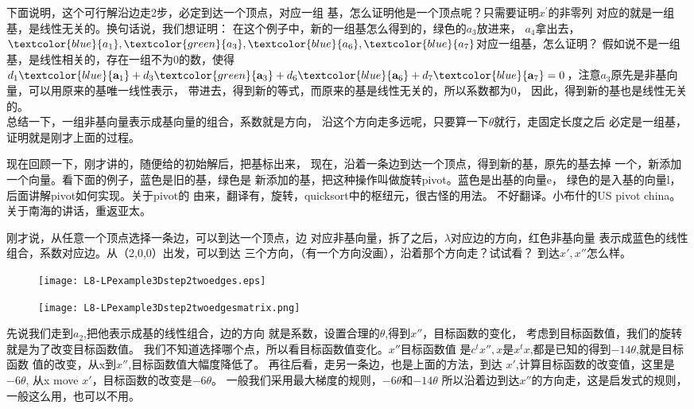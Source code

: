{
	下面说明，这个可行解沿边走2步，必定到达一个顶点，对应一组
	基，怎么证明他是一个顶点呢？只需要证明$x^{\prime}$的非零列
	对应的就是一组基，是线性无关的。换句话说，我们想证明：
	在这个例子中，新的一组基怎么得到的，绿色的$a_{3}$放进来，
	$a_{4}$拿出去， $\textcolor{blue}{a_1}, \textcolor{green}{a_3}, \textcolor{blue}{ a_6}, \textcolor{blue}{a_7}$对应一组基，怎么证明？
	假如说不是一组基，是线性相关的，存在一组不为0的数，使得
	$d_1   \textcolor{blue}{\mathbf{a}_1} + d_3    \textcolor{green}{\mathbf{a}_3} +  d_6   \textcolor{blue}{\mathbf{a}_6} +  d_7   \textcolor{blue}{\mathbf{a}_7}  = 0$，注意$a_{3}$原先是非基向量，可以用原来的基唯一线性表示，
	带进去，得到新的等式，而原来的基是线性无关的，所以系数都为0，
	因此，得到新的基也是线性无关的。\\
	总结一下，一组非基向量表示成基向量的组合，系数就是方向，
	沿这个方向走多远呢，只要算一下$\theta$就行，走固定长度之后
	必定是一组基，证明就是刚才上面的过程。

}
{
	现在回顾一下，刚才讲的，随便给的初始解后，把基标出来，
	现在，沿着一条边到达一个顶点，得到新的基，原先的基去掉
	一个，新添加一个向量。看下面的例子，蓝色是旧的基，绿色是
	新添加的基，把这种操作叫做旋转pivot。蓝色是出基的向量e，
	绿色的是入基的向量l，后面讲解pivot如何实现。关于pivot的
	由来，翻译有，旋转，quicksort中的枢纽元，很古怪的用法。
	不好翻译。小布什的US pivot china。关于南海的讲话，重返亚太。

}
{
	刚才说，从任意一个顶点选择一条边，可以到达一个顶点，边
	对应非基向量，拆了之后，$\lambda$对应边的方向，红色非基向量
	表示成蓝色的线性组合，系数对应边。从（2,0,0）出发，可以到达
	三个方向，（有一个方向没画），沿着那个方向走？试试看？
	到达$x',x''$怎么样。

}
{
	 \begin{figure}[htb]%
	 	\begin{center}%
	 		\begin{minipage}{0.43\textwidth}%
	 			\texttt{[image: L8-LPexample3Dstep2twoedges.eps]}%
	 		\end{minipage}%
	 		\quad
	 		\begin{minipage}{0.43\textwidth}
	 			\texttt{[image: L8-LPexample3Dstep2twoedgesmatrix.png]}%
	 		\end{minipage}%
	 	\end{center}
	 \end{figure}
}
{
	先说我们走到$a_{2}$,把他表示成基的线性组合，边的方向
	就是系数，设置合理的$\theta$,得到$x''$，目标函数的变化，
	考虑到目标函数值，我们的旋转就是为了改变目标函数值。
	我们不知道选择哪个点，所以看目标函数值变化。$x''$目标函数值
	是$c^{t}x'',x$是$x^{t}x$,都是已知的得到$-14\theta$,就是目标函数
	值的改变，从x到$x''$,目标函数值大幅度降低了。
}
{
	再往后看，走另一条边，也是上面的方法，到达
	$x'$,计算目标函数的改变值，这里是$-6\theta$,
	从x move $x'$，目标函数的改变是$-6\theta$。
	一般我们采用最大梯度的规则，$-6\theta$和$-14\theta$
	所以沿着边到达$x''$的方向走，这是启发式的规则，
	一般这么用，也可以不用。
}


